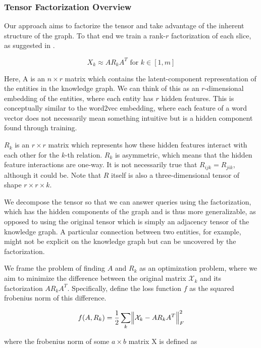 \documentclass[pageno]{final_paper}
\begin{document}
\subsubsection{Tensor Factorization Overview}
\label{Tensor Factorization Overview}

Our approach aims to factorize the tensor and take advantage of the inherent
structure of the graph. To that end we train a rank-$r$ factorization of each
slice, as suggested in \cite{Bader2007, Nickel2011}.

$$X_k \approx A R_k A^T \text{ for } k \in [1,m]$$

Here, A is an $n\times r$ matrix which contains the latent-component
representation of the entities in the knowledge graph. We can think of this as
an $r$-dimensional embedding of the entities, where each entity has $r$ hidden
features. This is conceptually similar to the word2vec embedding, where each
feature of a word vector does not necessarily mean something intuitive but is a
hidden component found through training.

$R_k$ is an $r\times r$ matrix which represents how these hidden features
interact with each other for the $k$-th relation. $R_k$ is asymmetric, which
means that the hidden feature interactions are one-way. It is not necessarily
true that $R_{ijk} = R_{jik}$, although it could be. Note that $R$ itself is
also a three-dimensional tensor of shape $r\times r\times k$.

We decompose the tensor so that we can answer queries using the factorization,
which has the hidden components of the graph and is thus more generalizable, as
opposed to using the original tensor which is simply an adjacency tensor of the
knowledge graph. A particular connection between two entities, for example,
might not be explicit on the knowledge graph but can be uncovered by the
factorization.

We frame the problem of finding $A$ and $R_k$ as an optimization problem, where
we aim to minimize the difference between the original matrix $\mathcal{X}_k$
and its factorization $AR_kA^T$. Specifically, define the loss function $f$ as
the squared frobenius norm of this difference.

\begin{equation}
\label{eq: loss function}
    f(A, R_k) = \dfrac{1}{2} \sum_k \norm{\mathcal{X}_k - AR_kA^T}_F^2
\end{equation}

where the frobenius norm of some $a\times b$ matrix X is defined as
\end{document}
